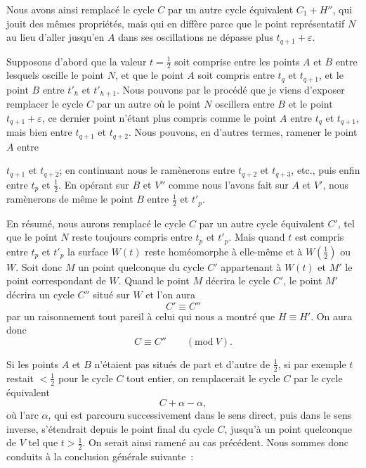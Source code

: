 \documentclass{article}
\begin{document}
Nous avons ainsi remplacé le cycle $C$ par un autre cycle équivalent $C_{1} + H''$, qui jouit des mêmes propriétés, mais qui en diffère parce que le point représentatif $N$ au lieu d'aller jusqu'en $A$ dans ses oscillations ne dépasse plus $t_{q+1} + \varepsilon$.

Supposons d'abord que la valeur $t = \frac{1}{2}$ soit comprise entre les points $A$ et $B$ entre lesquels oscille le point $N$, et que le point $A$ soit compris entre $t_{q}$ et $t_{q+1}$, et le point $B$ entre $t'_{h}$ et $t'_{h+1}$. Nous pouvons par le procédé que je viens d'exposer remplacer le cycle $C$ par un autre où le point $N$ oscillera entre $B$ et le point $t_{q+1} + \varepsilon$, ce dernier point n'étant plus compris comme le point $A$ entre $t_{q}$ et $t_{q+1}$, mais bien entre $t_{q+1}$ et $t_{q+2}$. Nous pouvons, en d'autres termes, ramener le point $A$ entre

$t_{q+1}$ et $t_{q+2}$; en continuant nous le ramènerons entre $t_{q+2}$ et $t_{q+3}$, etc., puis enfin entre $t_{p}$ et $\frac{1}{2}$. En opérant sur $B$ et $V''$ comme nous l'avons fait sur $A$ et $V'$, nous ramènerons de même le point $B$ entre $\frac{1}{2}$ et $t'_{p}$.

En résumé, nous aurons remplacé le cycle $C$ par un autre cycle équivalent $C'$, tel que le point $N$ reste toujours compris entre $t_{p}$ et $t'_{p}$. Mais quand $t$ est compris entre $t_{p}$ et $t'_{p}$ la surface $W(t)$ reste homéomorphe à elle-même et à $W\left(\frac{1}{2}\right)$ ou $W$. Soit donc $M$ un point quelconque du cycle $C'$ appartenant à $W(t)$ et $M'$ le point correspondant de $W$. Quand le point $M$ décrira le cycle $C'$, le point $M'$ décrira un cycle $C''$ situé sur $W$ et l'on aura
\[ C' \equiv C'' \]
par un raisonnement tout pareil à celui qui nous a montré que $H \equiv H'$. On aura donc
\[ C \equiv C'' \qquad (\text{mod}\ V). \]

Si les points $A$ et $B$ n'étaient pas situés de part et d'autre de $\frac{1}{2}$, si par exemple $t$ restait $< \frac{1}{2}$ pour le cycle $C$ tout entier, on remplacerait le cycle $C$ par le cycle équivalent
\[ C + \alpha - \alpha, \]
où l'arc $\alpha$, qui est parcouru successivement dans le sens direct, puis dans le sens inverse, s'étendrait depuis le point final du cycle $C$, jusqu'à un point quelconque de $V$ tel que $t > \frac{1}{2}$. On serait ainsi ramené au cas précédent. Nous sommes donc conduits à la conclusion générale suivante~:
\end{document}
